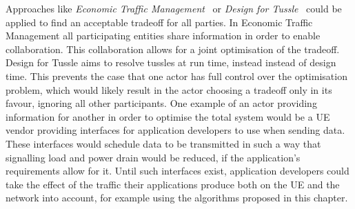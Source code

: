 Approaches like \emph{Economic Traffic Management}~\cite{spirou2009} or \emph{Design for Tussle}~\cite{trilogy2008} could be applied to find
an acceptable tradeoff for all parties.
In Economic Traffic Management all participating entities share information in order to enable collaboration.
This collaboration allows for a joint optimisation of the tradeoff.
Design for Tussle aims to resolve tussles at run time, instead instead of design time.
This prevents the case that one actor has full control over the optimisation problem, which would likely result in the actor choosing a tradeoff only in its favour, ignoring all other participants.
One example of an actor providing information for another in order to optimise the total system would be a \gls{UE} vendor providing interfaces for application developers to use when sending data.
These interfaces would schedule data to be transmitted in such a way that signalling load and power drain would be reduced, if the application’s requirements allow for it.
Until such interfaces exist, application developers could take the effect of the traffic their applications
produce both on the \gls{UE} and the network into account, for example using the algorithms proposed in this chapter.
